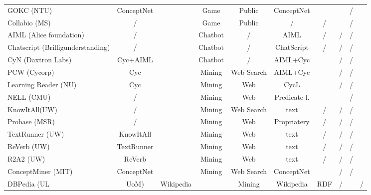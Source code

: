 \begin{landscape}
\begin{table}[htb]
\begin{adjustbox}{width=1.6\textwidth}
\begin{tabular}{lclcccccc}
		GOKC (NTU) & ConceptNet  & \parencite{Kuo2010}  & Game & Public  & ConceptNet  & \checkmark  & \checkmark  & /  \\
		Collabio (MS) & /  & \parencite{Bernstein2010}  & Game & Public  & /  & /  & \checkmark  & /  \\
		AIML (Alice foundation) & /  & \parencite{Wallace2003}  & Chatbot & /  & AIML  & /  & /  & /  \\
		Chatscript (Brilligunderstanding) & /  & \parencite{Wilcox2011}  & Chatbot & /  & ChatScript  & /  & /  & /  \\
		CyN (Daxtron Labs) & Cyc+AIML  & \parencite{Wilcox2011}  & Chatbot & /  & AIML+Cyc  & \checkmark  & /  & /  \\
	    PCW (Cycorp) & Cyc  & \parencite{Matuszek2004}  & Mining & Web Search  & AIML+Cyc  & \checkmark  & /  & /  \\
 		Learning Reader (NU) & Cyc & \parencite{Forbus2007} & Mining & Web & CycL & \checkmark & / & / \\
		NELL (CMU) & / & \parencite{Mitchell2015} & Mining & Web & Predicate l. & \checkmark & \checkmark & / \\ 
		KnowItAll(UW) & / & \parencite{Etzioni2004} & Mining & Web Search & text & / & / & / \\
		Probase (MSR) & / & \parencite{Wu2012}  & Mining & Web & Propriatery & / & / & / \\
        TextRunner (UW) & KnowItAll & \parencite{Soderland2007} & Mining & Web & text & / & / & / \\
		ReVerb (UW) & TextRunner & \parencite{Fader2011} & Mining & Web & text & / & / & / \\
		R2A2 (UW) & ReVerb & \parencite{Etzioni2011} & Mining & Web & text & / & / & / \\
		ConceptMiner (MIT) & ConceptNet & \parencite{Eslick2006} &Mining & Web Search & ConceptNet & \checkmark & / & / \\ 
		DBPedia (UL&UoM) & Wikipedia & \parencite{Lehmann2015} & Mining & Wikipedia &  RDF & / &\checkmark & / \\
		\hline
	\end{tabular}
	\end{adjustbox}
\end{table}
\end{landscape}


